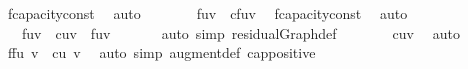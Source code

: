 {\ f{\isacharprime}{\isachardot}capacity{\isacharunderscore}const\ \isamarkupfalse%
\ auto\isanewline
\ \ \isamarkupfalse%
\ \isamarkupfalse%
\ {\isachardoublequoteopen}{\isasymdots}\ {\isasymle}\ f{\isacharparenleft}u{\isacharcomma}v{\isacharparenright}\ {\isacharplus}\ cf{\isacharparenleft}u{\isacharcomma}v{\isacharparenright}{\isachardoublequoteclose}\ \isamarkupfalse%
\ f{\isacharprime}{\isachardot}capacity{\isacharunderscore}const\ \isamarkupfalse%
\ auto\isanewline
\ \ \isamarkupfalse%
\ \isamarkupfalse%
\ {\isachardoublequoteopen}{\isasymdots}\ {\isacharequal}\ f{\isacharparenleft}u{\isacharcomma}v{\isacharparenright}\ {\isacharplus}\ c{\isacharparenleft}u{\isacharcomma}v{\isacharparenright}\ {\isacharminus}\ f{\isacharparenleft}u{\isacharcomma}v{\isacharparenright}{\isachardoublequoteclose}\ \isanewline
\ \ \ \ \isamarkupfalse%
\ {\isacharparenleft}auto\ simp{\isacharcolon}\ residualGraph{\isacharunderscore}def{\isacharparenright}\isanewline
\ \ \isamarkupfalse%
\ \isamarkupfalse%
\ {\isachardoublequoteopen}{\isasymdots}\ {\isacharequal}\ c{\isacharparenleft}u{\isacharcomma}v{\isacharparenright}{\isachardoublequoteclose}\ \isamarkupfalse%
\ auto\isanewline
\ \ \isamarkupfalse%
\ \isamarkupfalse%
\ {\isachardoublequoteopen}{\isacharparenleft}f{\isasymup}f{\isacharprime}{\isacharparenright}{\isacharparenleft}u{\isacharcomma}\ v{\isacharparenright}\ {\isasymle}\ c{\isacharparenleft}u{\isacharcomma}\ v{\isacharparenright}{\isachardoublequoteclose}\ \isacommand{{\isachardot}}\isamarkupfalse%
\isanewline
{}\isamarkupfalse%
\ {\isacharparenleft}auto\ simp{\isacharcolon}\ augment{\isacharunderscore}def\ cap{\isacharunderscore}positive{\isacharparenright}%
\endisatagproof
{\isafoldproof}%
%
\isadelimproof
%
\endisadelimproof
%
}%
